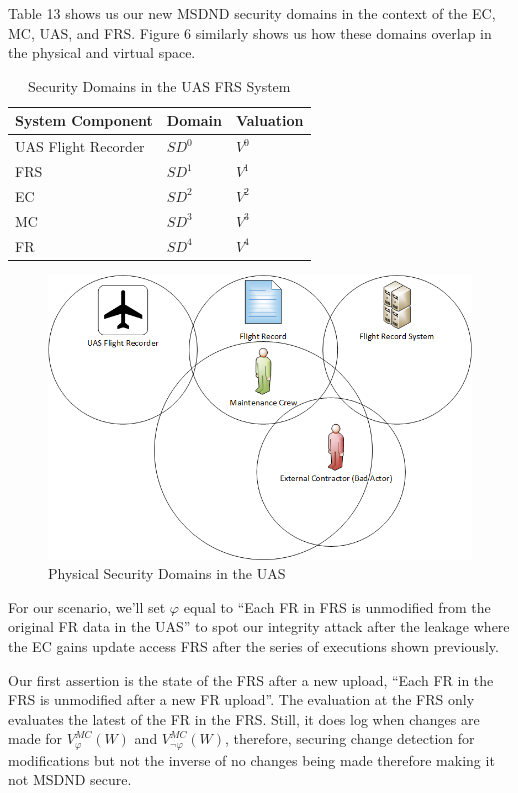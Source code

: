 \documentclass[10pt,journal,compsoc]{IEEEtran}
\begin{document}
Table 13 shows us our new MSDND security domains in the context of the EC, MC, UAS, and FRS. Figure 6 similarly shows us how these domains overlap in the physical and virtual space.

\begin{table}[]
  \caption{Security Domains in the UAS FRS System}
  \label{tab:security-domains}
  \centering
  \begin{tabular}{lll}
  \hline
  \textbf{System Component} & \textbf{Domain} & \textbf{Valuation} \\
  \hline
  UAS Flight Recorder       & $SD^{0}$       & $V^{0}$     \\
  FRS                       & $SD^{1}$       & $V^{1}$          \\
  EC                        & $SD^{2}$       & $V^{2}$           \\
  MC                        & $SD^{3}$       & $V^{3}$           \\
  FR                        & $SD^{4}$       & $V^{4}$          
  \end{tabular}
\end{table}

\begin{figure}[t]
  \caption{Physical Security Domains in the UAS} 
  \includegraphics[scale=0.43]{SDs.png}
\end{figure}

For our scenario, we'll set $\varphi$ equal to ``Each FR in FRS is unmodified from the original FR data in the UAS'' to spot our integrity attack after the leakage where the EC gains update access FRS after the series of executions shown previously. 

Our first assertion is the state of the FRS after a new upload, ``Each FR in the FRS is unmodified after a new FR upload''. The evaluation at the FRS only evaluates the latest of the FR in the FRS. Still, it does log when changes are made for $V^{MC}_{\varphi}(W)$ and $V^{MC}_{\lnot\varphi}(W)$, therefore, securing change detection for modifications but not the inverse of no changes being made therefore making it not MSDND secure.
\end{document}
